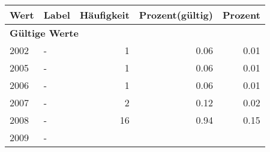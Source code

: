      \begin{longtable}{lXrrr}
     \toprule
     \textbf{Wert} & \textbf{Label} & \textbf{Häufigkeit} & \textbf{Prozent(gültig)} & \textbf{Prozent} \\
     \endhead
     \midrule
     \multicolumn{5}{l}{\textbf{Gültige Werte}}\\

     2002 &
     \multicolumn{1}{X}{ -  } &


       \num{1} &
       \num[round-mode=places,round-precision=2]{0,06} &
         \num[round-mode=places,round-precision=2]{0,01} \\

     2005 &
     \multicolumn{1}{X}{ -  } &


       \num{1} &
       \num[round-mode=places,round-precision=2]{0,06} &
         \num[round-mode=places,round-precision=2]{0,01} \\

     2006 &
     \multicolumn{1}{X}{ -  } &


       \num{1} &
       \num[round-mode=places,round-precision=2]{0,06} &
         \num[round-mode=places,round-precision=2]{0,01} \\

     2007 &
     \multicolumn{1}{X}{ -  } &


       \num{2} &
       \num[round-mode=places,round-precision=2]{0,12} &
         \num[round-mode=places,round-precision=2]{0,02} \\

     2008 &
     \multicolumn{1}{X}{ -  } &


       \num{16} &
       \num[round-mode=places,round-precision=2]{0,94} &
         \num[round-mode=places,round-precision=2]{0,15} \\

     2009 &
     \multicolumn{1}{X}{ -  } &



\end{longtable}
